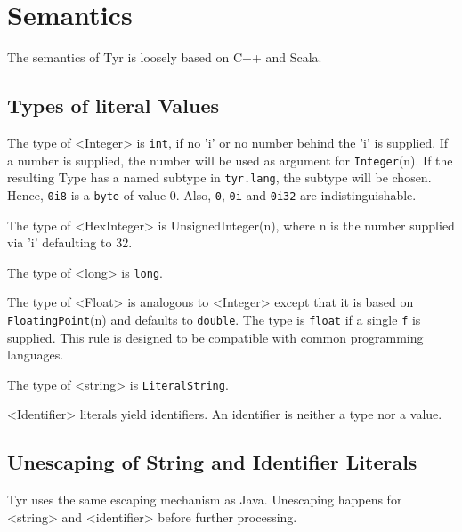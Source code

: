 \section{Semantics}

The semantics of Tyr is loosely based on C++ and Scala.

\subsection{Types of literal Values}

The type of <Integer> is \texttt{int}, if no 'i' or no number behind the 'i' is supplied.
If a number is supplied, the number will be used as argument for \texttt{Integer}(n).
If the resulting Type has a named subtype in \texttt{tyr.lang}, the subtype will be chosen.
Hence, \texttt{0i8} is a \texttt{byte} of value 0.
Also, \texttt{0}, \texttt{0i} and \texttt{0i32} are indistinguishable.

The type of <HexInteger> is UnsignedInteger(n), where n is the number supplied via 'i' defaulting to 32.

The type of <long> is \texttt{long}.

The type of <Float> is analogous to <Integer> except that it is based on \texttt{FloatingPoint}(n) and defaults to \texttt{double}.
The type is \texttt{float} if a single \texttt{f} is supplied.
This rule is designed to be compatible with common programming languages.

The type of <string> is \texttt{LiteralString}.

<Identifier> literals yield identifiers.
An identifier is neither a type nor a value.

\subsection{Unescaping of String and Identifier Literals}

Tyr uses the same escaping mechanism as Java.
Unescaping happens for <string> and <identifier> before further processing.